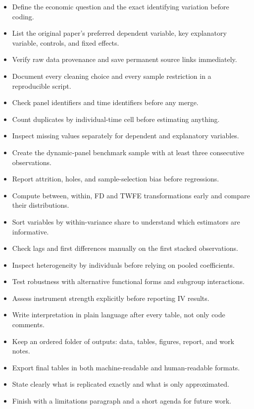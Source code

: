 \documentclass[a4paper,11pt]{article}
\renewcommand{\_}{\textunderscore\allowbreak}
\providecommand{\tightlist}{%
  \setlength{\itemsep}{0pt}\setlength{\parskip}{0pt}}
\begin{document}
\begin{itemize}
\tightlist
\item[$\square$]
  Define the economic question and the exact identifying variation
  before coding.
\item[$\square$]
  List the original paper's preferred dependent variable, key
  explanatory variable, controls, and fixed effects.
\item[$\square$]
  Verify raw data provenance and save permanent source links
  immediately.
\item[$\square$]
  Document every cleaning choice and every sample restriction in a
  reproducible script.
\item[$\square$]
  Check panel identifiers and time identifiers before any merge.
\item[$\square$]
  Count duplicates by individual-time cell before estimating anything.
\item[$\square$]
  Inspect missing values separately for dependent and explanatory
  variables.
\item[$\square$]
  Create the dynamic-panel benchmark sample with at least three
  consecutive observations.
\item[$\square$]
  Report attrition, holes, and sample-selection bias before regressions.
\item[$\square$]
  Compute between, within, FD and TWFE transformations early and compare
  their distributions.
\item[$\square$]
  Sort variables by within-variance share to understand which estimators
  are informative.
\item[$\square$]
  Check lags and first differences manually on the first stacked
  observations.
\item[$\square$]
  Inspect heterogeneity by individuals before relying on pooled
  coefficients.
\item[$\square$]
  Test robustness with alternative functional forms and subgroup
  interactions.
\item[$\square$]
  Assess instrument strength explicitly before reporting IV results.
\item[$\square$]
  Write interpretation in plain language after every table, not only
  code comments.
\item[$\square$]
  Keep an ordered folder of outputs: data, tables, figures, report,
  and work notes.
\item[$\square$]
  Export final tables in both machine-readable and human-readable
  formats.
\item[$\square$]
  State clearly what is replicated exactly and what is only
  approximated.
\item[$\square$]
  Finish with a limitations paragraph and a short agenda for future
  work.
\end{itemize}
\end{document}
